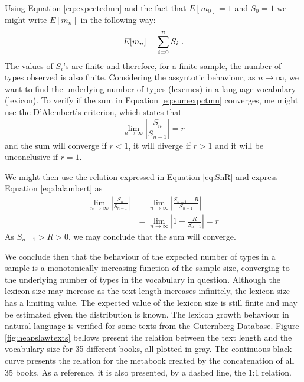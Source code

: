 Using Equation \ref{eq:expectedmn} and the fact that $E[m_0]=1$ and $S_0=1$ we might write
$E[m_n]$ in the following way:
\begin{equation}
\label{eq:sumexpctmn}
E[m_n] = \sum_{i=0}^n S_i \textmd{ .}
\end{equation}
The values of $S_i$'s are finite and therefore, for a finite sample, the number of types
observed is also finite. Considering the assyntotic behaviour, as $n \rightarrow \infty$,
we want to find the underlying number of types (lexemes) in a language vocabulary (lexicon).
To verify if the sum in Equation \ref{eq:sumexpctmn} converges, me might use the D'Alembert's criterion,
which states that
\begin{equation}
\label{eq:dalambert}
\lim_{n \to \infty} \left| \frac{S_n}{S_{n-1}} \right| = r
\end{equation}
and the sum will converge if $r <1$, it will diverge if $r > 1$ and it will be unconclusive
if $r=1$. 

We might then use the relation expressed in Equation \ref{eq:SnR} and express Equation
\ref{eq:dalambert} as
\begin{align}
\lim_{n \to \infty} \left| \frac{S_n}{S_{n-1}} \right| &= \lim_{n \to \infty} \left| \frac{S_{n-1} - R}{S_{n-1}} \right| \nonumber \\
       &= \lim_{n \to \infty} \left| 1 - \frac{R}{S_{n-1}} \right| = r
\end{align}
As $S_{n-1} > R > 0$, we may conclude that the sum will converge. 

We conclude then that 
the behaviour of the expected number of types in a sample is a monotonically increasing
function of the sample size, converging to the underlying number of types in the vocabulary 
in question. Although the lexicon size may increase as the text length 
increases infinitely, the lexicon size has a limiting value.
The expected value of the lexicon size is still finite and may be estimated given 
the distribution is known.
The lexicon growth behaviour in natural language is verified for some texts from the Guternberg 
Database. Figure \ref{fig:heapslawtexts} bellows present the relation between the text length and
the vocabulary size for 35 different books, all plotted in gray. The continuous black curve
presents the relation for the metabook created by the concatenation of all 35 books. As a reference,
it is also presented, by a dashed line, the 1:1 relation.
 

